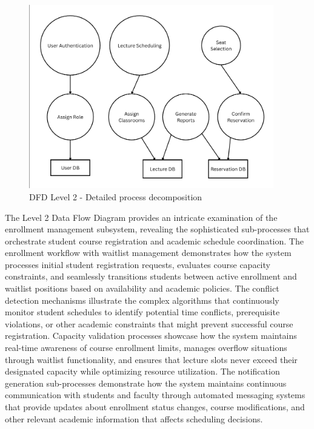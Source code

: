 \begin{figure}[htbp]
    \centering
    \includegraphics[width=0.95\textwidth]{images/DFD Level 2.png}
    \caption{DFD Level 2 - Detailed process decomposition}
    \label{fig:dfd2}
\end{figure}

The Level 2 Data Flow Diagram provides an intricate examination of the enrollment management subsystem, revealing the sophisticated sub-processes that orchestrate student course registration and academic schedule coordination. The enrollment workflow with waitlist management demonstrates how the system processes initial student registration requests, evaluates course capacity constraints, and seamlessly transitions students between active enrollment and waitlist positions based on availability and academic policies. The conflict detection mechanisms illustrate the complex algorithms that continuously monitor student schedules to identify potential time conflicts, prerequisite violations, or other academic constraints that might prevent successful course registration. Capacity validation processes showcase how the system maintains real-time awareness of course enrollment limits, manages overflow situations through waitlist functionality, and ensures that lecture slots never exceed their designated capacity while optimizing resource utilization. The notification generation sub-processes demonstrate how the system maintains continuous communication with students and faculty through automated messaging systems that provide updates about enrollment status changes, course modifications, and other relevant academic information that affects scheduling decisions.

